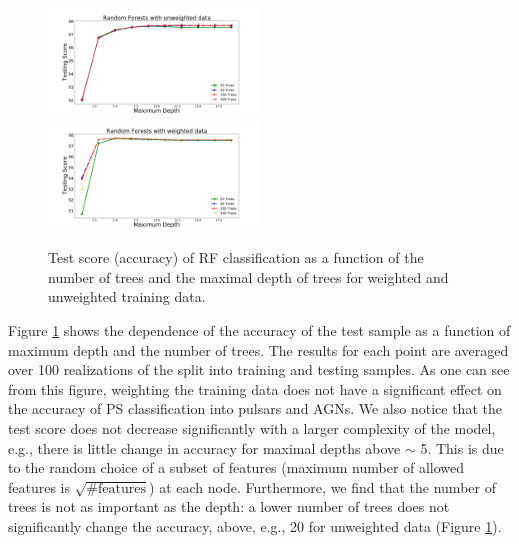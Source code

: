 \begin{figure}[h]
\hspace*{-0.5cm}
\includegraphics[width=0.5\textwidth]{plots/rf_train_unweighted}
\hspace*{-0.5cm}
\includegraphics[width=0.5\textwidth]{plots/rf_train_weighted}
\caption{
Test score (accuracy) of RF classification as a function of the number of trees and 
the maximal depth of trees for weighted and unweighted training data.
}
\label{fig:RF_complexity}
\end{figure}

Figure \ref{fig:RF_complexity} shows the dependence of the accuracy of the test sample as a function of maximum depth and the number of trees. 
The results for each point are averaged over 100 realizations of the split into training and testing samples.
As one can see from this figure,
weighting the training data does not have a significant effect on the accuracy of PS classification into pulsars and AGNs.
We also notice that the test score does not decrease significantly with a larger complexity of the model, e.g., there is little change in accuracy for maximal depths above $\sim$ 5.
This is due to the random choice of a subset of features (maximum number of allowed features is $\sqrt{\text{\# features}}$) at each node.
Furthermore, we find that the number of trees is not as important as the depth: a lower number of trees does not significantly change the accuracy, above, e.g., 20 for unweighted data (Figure \ref{fig:RF_complexity}). 

